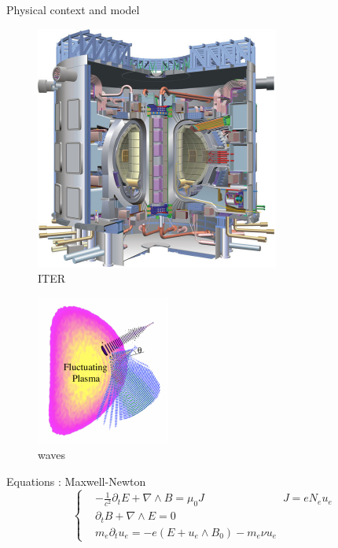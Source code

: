 \begin{frame}{Physical context and model}
 \begin{minipage}{0.45\linewidth}
 \begin{figure}
       		\includegraphics[scale = 0.7]{./images/ITER_cut}
       	\caption{ITER}
     	 \end{figure} 
\end{minipage}
\hfill
\begin{minipage}{0.45\linewidth}
 \begin{figure}
       		\includegraphics[scale = 1.2]{./images/antenne}
       		\caption{waves}
     	 \end{figure} 
\end{minipage}
\begin{block}{Equations : Maxwell-Newton}
\[
\begin{cases}
&-\frac{1}{c^2}\partial_t E + \nabla \wedge B = \mu_0 J \hspace{3cm} J = e N_e u_e\\
&\partial_t B + \nabla \wedge E  = 0	\\
&m_e \partial_t u_e  =  -e(E + u_e \wedge B_0 ) - m_e \nu u_e
\end{cases}
\]
\end{block}


\end{frame}

